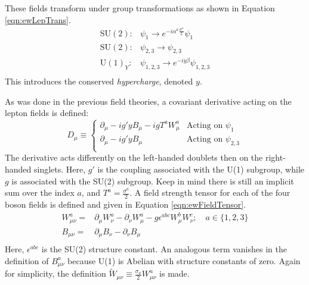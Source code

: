 These fields transform under group transformations as shown in Equation \ref{eqn:ewLepTrans}.
\begin{equation}\begin{split}\label{eqn:ewLepTrans}
    \text{SU}(2):& \psi_1\to e^{-i\alpha^a\frac{\sigma^a}{2}}\psi_1 \\
    \text{SU}(2):& \psi_{2,3}\to \psi_{2,3} \\
    \text{U}(1)_Y:& \psi_{1,2,3}\to e^{-iy\beta}\psi_{1,2,3} \\
\end{split}\end{equation}
This introduces the conserved \emph{hypercharge}, denoted $y$.

As was done in the previous field theories, a covariant derivative acting on the lepton fields is defined:
\begin{equation}\label{eqn:ewCovDeriv}
        D_\mu\equiv
        \begin{cases}
         \partial_\mu-ig'yB_\mu-igT^aW_\mu^a  & \text{Acting on }\psi_1\\
         \partial_\mu-ig'yB_\mu & \text{Acting on }\psi_{2,3} \\
        \end{cases}
\end{equation}
The derivative acts differently on the left-handed doublets then on the right-handed singlets.
Here, $g'$ is the coupling associated with the U(1) subgroup, while $g$ is associated with the SU(2) subgroup.
Keep in mind there is still an implicit sum over the index $a$, and $T^a=\frac{\sigma^a}{2}$.
A field strength tensor for each of the four boson fields is defined and given in Equation \ref{eqn:ewFieldTensor}.
\begin{equation}\begin{split}\label{eqn:ewFieldTensor}
W^a_{\mu\nu} =& \partial_\mu W^a_\nu-\partial_\nu W^a_\mu-g\epsilon^{abc}W^b_\mu W^c_\nu; \quad a\in\{1,2,3\} \\
B_{\mu\nu} =& \partial_\mu B_\nu-\partial_\nu B_\mu \\
\end{split}\end{equation}
Here, $\epsilon^{abc}$ is the SU(2) structure constant.
An analogous term vanishes in the definition of $B^a_{\mu\nu}$ because U(1) is Abelian with structure constants of zero.
Again for simplicity, the definition $\widetilde{W}_{\mu\nu}\equiv\frac{\sigma_a}{2}W_{\mu\nu}^a$ is made.


